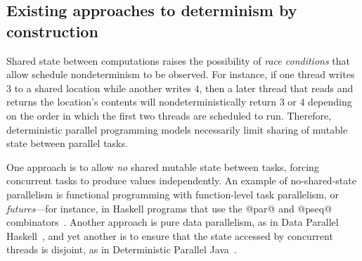\documentclass{article}
\begin{document}
\subsection{Existing approaches to determinism by construction}

Shared state between computations raises the possibility of \emph{race
  conditions} that allow schedule nondeterminism to be observed.  For
instance, if one thread writes $3$ to a shared location while another
writes $4$, then a later thread that reads and returns the location's
contents will nondeterministically return $3$ or $4$ depending on the
order in which the first two threads are scheduled to run.  Therefore,
deterministic parallel programming models necessarily limit sharing of
mutable state between parallel tasks.

One approach is to allow \emph{no} shared mutable state between tasks,
forcing concurrent tasks to produce values independently.  An example
of no-shared-state parallelism is functional programming with
function-level task parallelism, or \emph{futures}---for instance, in
Haskell programs that use the @par@ and @pseq@
combinators~\cite{marlow-par}.  Another approach is pure data
parallelism, as in Data Parallel Haskell~\cite{dph}, and yet another
is to ensure that the state accessed by concurrent threads is
disjoint, as in Deterministic Parallel Java~\cite{dpj-oopsla}.
\end{document}
